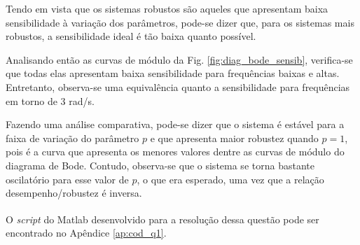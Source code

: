 Tendo em vista que os sistemas robustos são aqueles que apresentam baixa
sensibilidade à variação dos parâmetros, pode-se dizer que, para os sistemas
mais robustos, a sensibilidade ideal é tão baixa quanto possível.

Analisando então as curvas de módulo da Fig. \ref{fig:diag_bode_sensib},
verifica-se que todas elas apresentam baixa sensibilidade para frequências
baixas e altas. Entretanto, observa-se uma equivalência quanto a sensibilidade
para frequências em torno de 3 rad/s.

Fazendo uma análise comparativa, pode-se dizer que o sistema é estável para a
faixa de variação do parâmetro $p$ e que apresenta maior robustez quando $p =
1$, pois é a curva que apresenta os menores valores dentre as curvas de módulo
do diagrama de Bode. Contudo, observa-se que o sistema se torna bastante
oscilatório para esse valor de $p$, o que era esperado, uma vez que a relação
desempenho/robustez é inversa.

O {\it script} do Matlab\textsuperscript{\textregistered} desenvolvido para a
resolução dessa questão pode ser encontrado no Apêndice \ref{ap:cod_q1}.
